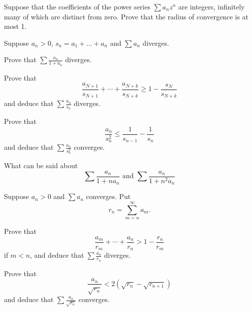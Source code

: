 \begin{myexercise}
    \label{ex:3.10}
    Suppose that the coefficients of the power series $\sum a_n z^n$ are integers, 
    infinitely many of which are distinct from zero. 
    Prove that the radius of convergence is at most 1.
\end{myexercise}

\begin{myexercise}
    \label{ex:3.11}
    Suppose $a_n > 0$, $s_n = a_1 + ... + a_n$ and $\sum a_n$ diverges.
    \begin{asparaenum}[(a)]
        \item Prove that $\sum \frac{a_n}{1+a_n}$ diverges.
        \item Prove that 
        \begin{equation*}
            \frac{a_{N+1}}{s_{N+1}} + \cdots +
            \frac{a_{N+k}}{s_{N+k}} \geq 
            1- \frac{s_N}{s_{N+k}}
        \end{equation*}
        and deduce that $\sum \frac{a_n}{s_n}$ diverges.
        \item Prove that 
        \begin{equation*}
            \frac{a_n}{s_n^2} \leq \frac{1}{s_{n-1}} - \frac{1}{s_n}
        \end{equation*}
        and deduce that $\sum \frac{a_n}{s_n^2}$ converges.
        \item What can be said about 
        \begin{equation*}
            \sum \frac{a_n}{1+n a_n} 
            \text{ and }
            \sum \frac{a_n}{1+n^2a_n}
        \end{equation*}
    \end{asparaenum}
\end{myexercise}

\begin{myexercise}
    \label{ex:3.12}
    Suppose $a_n > 0$ and $\sum a_n$ converges. Put
    \begin{equation*}
        r_n = \sum_{m=n}^{\infty} a_m .
    \end{equation*}
    \begin{asparaenum}[(a)]
        \item Prove that 
        \begin{equation*}
            \frac{a_m}{r_m} + \cdots +
            \frac{a_n}{r_n} > 
            1 - \frac{r_n}{r_m}
        \end{equation*}
        if $m<n$, and deduce that $\sum \frac{a_n}{r_n}$ diverges.
        \item Prove that 
        \begin{equation*}
            \frac{a_n}{\sqrt{r_n}} < 
            2\left( \sqrt{r_n} - \sqrt{r_{n+1}} \right)
        \end{equation*}
        and deduce that $\sum \frac{a_n}{\sqrt{r_n}}$ converges.
    \end{asparaenum}
\end{myexercise}


